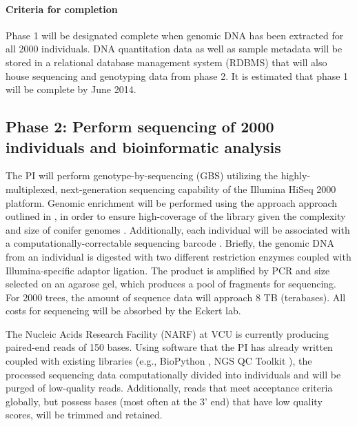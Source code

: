 \paragraph{Criteria for completion}
Phase 1 will be designated complete when genomic DNA has been extracted for all \num{2000} individuals.  
DNA quantitation data as well as sample metadata will be stored in a relational database management system (RDBMS) 
that will also house sequencing and genotyping data from phase 2.  It is estimated that phase 1 will be complete by June 2014.

\subsection*{Phase 2: Perform sequencing of 2000 individuals and bioinformatic analysis}

The PI will perform genotype-by-sequencing (GBS) utilizing the highly-multiplexed, next-generation sequencing capability of the 
Illumina HiSeq 2000 platform.  Genomic enrichment will be performed using the approach approach outlined in 
\cite{Parchman:2012ca}, in order to ensure high-coverage of the library given the complexity and size of conifer genomes 
\citep{Mackay:2012hr}.  Additionally, each individual will be associated with a computationally-correctable sequencing 
barcode \citep{Roche454MID}.  
Briefly, the genomic DNA from an individual is digested with two different restriction enzymes coupled with Illumina-specific 
adaptor ligation.  The product is amplified by PCR and size selected on an agarose gel, which produces a pool of fragments for 
sequencing.  For 2000 trees, the amount of sequence data will approach 8 TB (terabases).  All costs for sequencing will be 
absorbed by the Eckert lab.   

The Nucleic Acids Research Facility (NARF) at VCU is currently producing paired-end reads of 150 bases.  Using software that the 
PI has already written \citep{code:2008wq} coupled with existing libraries (e.g., BioPython \citep{Cock:2009hj}, NGS QC Toolkit 
\citep{Patel:2012fq}), the processed sequencing data computationally divided into individuals and will be purged of 
low-quality reads. Additionally, reads that meet acceptance criteria globally, but possess bases (most often at the 3' end) 
that have low quality scores, will be trimmed and retained.

